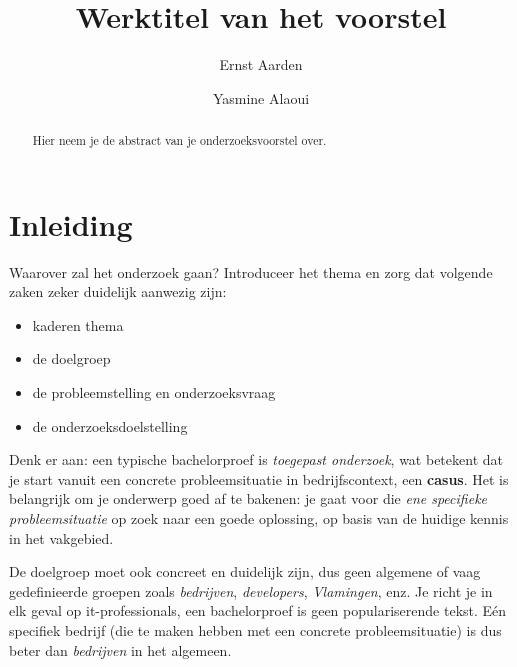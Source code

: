 \documentclass{hogent-article}
\title{Werktitel van het voorstel}
\author{Ernst Aarden}
\author{Yasmine Alaoui}
\begin{document}
\begin{abstract}
  Hier neem je de abstract van je onderzoeksvoorstel over.
\end{abstract}

\tableofcontents

\bigskip





\section{Inleiding}%
\label{sec:inleiding}


Waarover zal het onderzoek gaan? Introduceer het thema en zorg dat volgende zaken zeker duidelijk aanwezig zijn:

\begin{itemize}
  \item kaderen thema
  \item de doelgroep
  \item de probleemstelling en onderzoeksvraag
  \item de onderzoeksdoelstelling
\end{itemize}

Denk er aan: een typische bachelorproef is \textit{toegepast onderzoek}, wat betekent dat je start vanuit een concrete probleemsituatie in bedrijfscontext, een \textbf{casus}. Het is belangrijk om je onderwerp goed af te bakenen: je gaat voor die \textit{ene specifieke probleemsituatie} op zoek naar een goede oplossing, op basis van de huidige kennis in het vakgebied.

De doelgroep moet ook concreet en duidelijk zijn, dus geen algemene of vaag gedefinieerde groepen zoals \emph{bedrijven}, \emph{developers}, \emph{Vlamingen}, enz. Je richt je in elk geval op it-professionals, een bachelorproef is geen populariserende tekst. Eén specifiek bedrijf (die te maken hebben met een concrete probleemsituatie) is dus beter dan \emph{bedrijven} in het algemeen.
\end{document}
